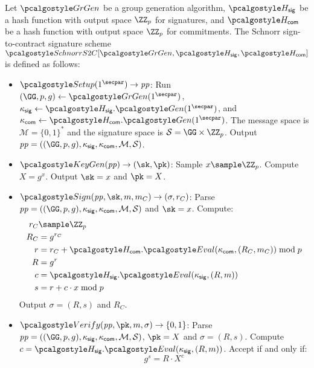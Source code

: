 \begin{definition}\label{def:schnorr-s2c}
  Let $\grgen$ be a group generation algorithm, $\algo{H}_{\mathsf{sig}}$ be a hash function with output space $\ZZ_p$ for signatures, and $\algo{H}_{\mathsf{com}}$ be a hash function with output space $\ZZ_p$ for commitments. The Schnorr sign-to-contract signature scheme $\algo{SchnorrS2C}[\grgen, \algo{H}_{\mathsf{sig}}, \algo{H}_{\mathsf{com}}]$ is defined as follows:
  \begin{itemize}
    \item $\algo{Setup}(1^\secpar) \rightarrow \params$: Run $\gparam \gets \grgen(1^\secpar)$, $\kappa_{\mathsf{sig}} \gets \algo{H}_{\mathsf{sig}}.\algo{Gen}(1^\secpar)$, and $\kappa_{\mathsf{com}} \gets \algo{H}_{\mathsf{com}}.\algo{Gen}(1^\secpar)$. The message space is $\mathcal{M} = \{0,1\}^*$ and the signature space is $\mathcal{S} = \GG \times \ZZ_p$. Output $\params = (\gparam, \kappa_{\mathsf{sig}}, \kappa_{\mathsf{com}}, \mathcal{M}, \mathcal{S})$.
    
    \item $\algo{KeyGen}(\params) \rightarrow (\sk, \pk)$: Sample $x \sample \ZZ_p$. Compute $X = g^x$. Output $\sk = x$ and $\pk = X$.
    
    \item $\algo{Sign}(\params, \sk, m, m_C) \rightarrow (\sigma, r_C)$: Parse $\params = (\gparam, \kappa_{\mathsf{sig}}, \kappa_{\mathsf{com}}, \mathcal{M}, \mathcal{S})$ and $\sk = x$. Compute:
    \begin{align*}
      r_C &\sample \ZZ_p\\
      R_C &= g^{r_C} \\
      r &= r_C + \algo{H}_{\mathsf{com}}.\algo{Eval}(\kappa_{\mathsf{com}}, (R_C, m_C))  \bmod p\\
      R &= g^r \\
      c &= \algo{H}_{\mathsf{sig}}.\algo{Eval}(\kappa_{\mathsf{sig}}, (R, m)) \\
      s &= r + c \cdot x \bmod p
    \end{align*}
    Output $\sigma = (R, s)$ and $R_C$.
    
    \item $\algo{Verify}(\params, \pk, m, \sigma) \rightarrow \{0, 1\}$: Parse $\params = (\gparam, \kappa_{\mathsf{sig}}, \kappa_{\mathsf{com}}, \mathcal{M}, \mathcal{S})$, $\pk = X$ and $\sigma = (R, s)$. Compute $c = \algo{H}_{\mathsf{sig}}.\algo{Eval}(\kappa_{\mathsf{sig}}, (R, m))$. Accept if and only if:
    \[
      g^s = R \cdot X^c
    \]
  \end{itemize}
\end{definition}

